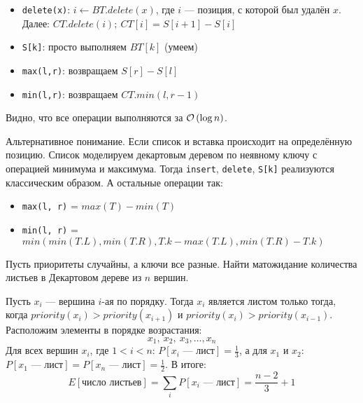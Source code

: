 \begin{solution}
\begin{itemize}
	\item \texttt{delete(x)}: $i \leftarrow BT.delete(x)$, где $i$ --- позиция, с которой был удалён $x$. Далее: $CT.delete(i);\ CT[i] = S[i + 1] - S[i]$
	\item \texttt{S[k]}: просто выполняем $BT[k]$ (умеем)
	\item \texttt{max(l,r)}: возвращаем $S[r] - S[l]$
	\item \texttt{min(l,r)}: возвращаем $CT.min(l, r - 1)$
\end{itemize}
Видно, что все операции выполняются за $\mathcal{O}\left(\log{n}\right)$. \xqed
\begin{paragraph}{Альтернативное понимание.} Если список и вставка происходит на определённую позицию. Список моделируем декартовым деревом по неявному ключу с операцией минимума и максимума. Тогда \texttt{insert}, \texttt{delete}, \texttt{S[k]} реализуются классическим образом. А остальные операции так:
\begin{itemize}
 	\item \texttt{max(l, r)} = $max(T) - min(T)$
 	\item \texttt{min(l, r)} = $min(min(T.L), min(T.R), T.k - max(T.L), min(T.R) - T.k)$
\end{itemize} 
\end{paragraph}
\end{solution}

\begin{task}[3]
Пусть приоритеты случайны, а ключи все разные. Найти матожидание количества листьев в Декартовом дереве из $n$ вершин.
\end{task}
\begin{solution}
Пусть $x_i$ --- вершина $i$-ая по порядку. Тогда $x_i$ является листом только тогда, когда $priority(x_i) > priority(x_{i+1})$ и $priority(x_i) > priority(x_{i-1})$. Расположим элементы в порядке возрастания:
\[
	x_1,\ x_2,\ x_3, \ldots, x_n
\]
Для всех вершин $x_i$, где $1 < i < n$: $P[x_i \text{ --- лист}] = \frac{1}{3}$, а для $x_1$ и $x_2$: $P[x_1 \text{ --- лист}] = P[x_n \text{ --- лист}] = \frac{1}{2}$.
В итоге:
\[
	E[\text{число листьев}] = \sum_{i}{P[x_i \text{ --- лист}]} = \frac{n - 2}{3} + 1
\]
\end{solution}

